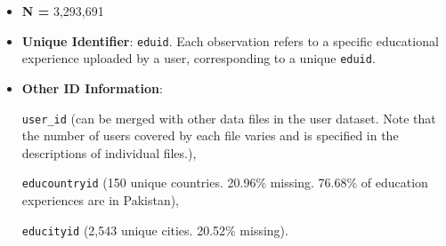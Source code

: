 \documentclass[12pt]{article}
\begin{document}
\begin{itemize}
    \item \textbf{N = }3,293,691
    \item \textbf{Unique Identifier}: \texttt{eduid}. Each observation refers to a specific educational experience uploaded by a user, corresponding to a unique \texttt{eduid}.
    \item \textbf{Other ID Information}: 
    
    \texttt{user\_id} (can be merged with other data files in the user dataset. Note that the number of users covered by each file varies and is specified in the descriptions of individual files.), 
    
    \texttt{educountryid} (150 unique countries. 20.96\% missing. 76.68\% of education experiences are in Pakistan), 
    
    \texttt{educityid} (2,543 unique cities. 20.52\% missing).
    \end{itemize}
\end{document}

